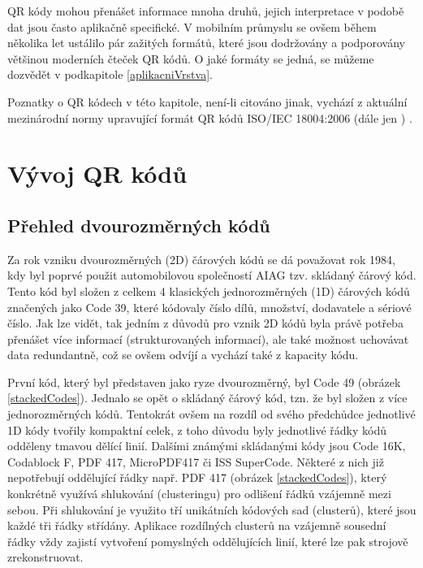 QR kódy mohou přenášet informace mnoha druhů, jejich interpretace v podobě dat 
jsou často aplikačně specifické. V mobilním průmyslu se ovšem během několika let 
ustálilo pár zažitých formátů, které jsou dodržovány a podporovány většinou 
moderních čteček QR kódů. O jaké formáty se jedná, se můžeme dozvědět v 
podkapitole \ref{aplikacniVrstva}.

Poznatky o QR kódech v této kapitole, není-li citováno jinak, vychází z aktuální 
mezinárodní normy upravující formát QR kódů ISO/IEC 18004:2006 
(dále jen ) \cite{ISO180042006}.

\section{Vývoj QR kódů}
\label{vyvojQRKodu}

\subsection{Přehled dvourozměrných kódů}
\label{prehled2DKodu}

Za rok vzniku dvourozměrných (2D) čárových kódů se dá považovat rok 1984, kdy 
byl poprvé použit automobilovou společností AIAG  tzv. skládaný čárový kód. 
Tento kód byl složen z celkem 4 klasických jednorozměrných (1D) čárových kódů 
značených jako Code 39, které kódovaly číslo dílů, množství, dodavatele a 
sériové číslo. Jak lze vidět, tak jedním z důvodů pro vznik 2D kódů byla právě 
potřeba přenášet více informací (strukturovaných informací), ale také možnost 
uchovávat data redundantně, což se ovšem odvíjí a vychází také z kapacity kódu.
\cite{adams12D}

První kód, který byl představen jako ryze dvourozměrný, byl Code 49 (obrázek
\ref{stackedCodes}).
Jednalo se opět o skládaný čárový kód, tzn. že byl složen z více jednorozměrných 
kódů. Tentokrát ovšem na rozdíl od svého předchůdce jednotlivé 1D kódy tvořily 
kompaktní celek, z toho důvodu byly jednotlivé řádky kódů odděleny tmavou 
dělící linií. Dalšími známými skládanými kódy jsou Code 16K, Codablock F, 
PDF 417, MicroPDF417 či ISS SuperCode. Některé z nich již nepotřebují oddělující 
řádky např. PDF 417 (obrázek \ref{stackedCodes}), který konkrétně využívá
shlukování (clusteringu) pro odlišení řádků vzájemně mezi sebou. Při shlukování je využito tří unikátních 
kódových sad (clusterů), které jsou každé tři řádky střídány. Aplikace rozdílných 
clusterů na vzájemně sousední řádky vždy zajistí vytvoření pomyslných 
oddělujících linií, které lze pak strojově zrekonstruovat.
\cite{AIMStacked,neodynamic}
             
